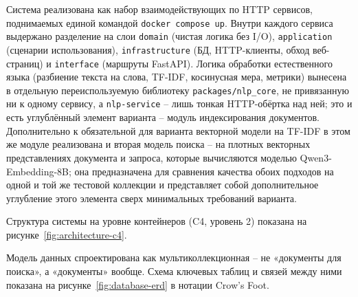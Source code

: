 

Система реализована как набор взаимодействующих по HTTP сервисов,
поднимаемых единой командой \texttt{docker compose up}. Внутри каждого
сервиса выдержано разделение на слои \texttt{domain} (чистая логика без
I/O), \texttt{application} (сценарии использования),
\texttt{infrastructure} (БД, HTTP-клиенты, обход веб-страниц) и
\texttt{interface} (маршруты FastAPI). Логика обработки естественного
языка (разбиение текста на слова, TF-IDF, косинусная мера, метрики)
вынесена в отдельную переиспользуемую библиотеку
\texttt{packages/nlp\_core}, не привязанную ни к одному сервису, а
\texttt{nlp-service} -- лишь тонкая HTTP-обёртка над ней; это и есть
углублённый элемент варианта -- модуль индексирования документов.
Дополнительно к обязательной для варианта векторной модели на TF-IDF в
этом же модуле реализована и вторая модель поиска -- на плотных
векторных представлениях документа и запроса, которые вычисляются
моделью Qwen3-Embedding-8B; она предназначена для сравнения качества
обоих подходов на одной и той же тестовой коллекции и представляет
собой дополнительное углубление этого элемента сверх минимальных
требований варианта.

Структура системы на уровне контейнеров (C4, уровень 2) показана на
рисунке~\ref{fig:architecture-c4}.




Модель данных спроектирована как мультиколлекционная -- не «документы для
поиска», а «документы» вообще.
Схема ключевых таблиц и связей между ними показана на
рисунке~\ref{fig:database-erd} в нотации Crow's Foot.

